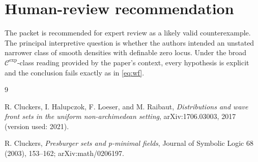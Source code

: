 \documentclass[11pt]{article}
\newcommand{\cCexp}{\mathcal C^{\mathrm{exp}}}
\begin{document}
\section{Human-review recommendation}

The packet is recommended for expert review as a likely valid counterexample.
The principal interpretive question is whether the authors intended an
unstated narrower class of smooth densities with definable zero locus.  Under
the broad \(\cCexp\)-class reading provided by the paper's context, every
hypothesis is explicit and the conclusion fails exactly as in
\eqref{eq:wf}.

\begin{thebibliography}{9}

R. Cluckers, I. Halupczok, F. Loeser, and M. Raibaut,
\emph{Distributions and wave front sets in the uniform non-archimedean
setting}, arXiv:1706.03003, 2017 (version used: 2021).

R. Cluckers,
\emph{Presburger sets and p-minimal fields},
Journal of Symbolic Logic 68 (2003), 153--162;
arXiv:math/0206197.

\end{thebibliography}
\end{document}
